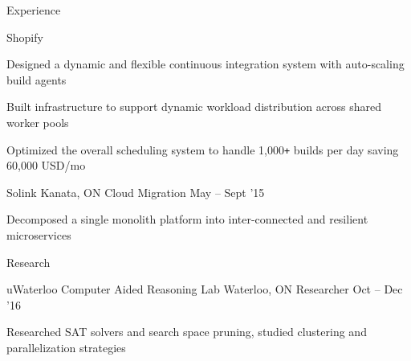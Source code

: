 \documentclass{resume} %
\begin{document}
\begin{rSection}{Experience}
\begin{rSubsection}{Shopify}
  \item Designed a dynamic and flexible continuous integration system with
    auto-scaling build agents
  \item Built infrastructure to support dynamic workload distribution across
    shared worker pools
  \item Optimized the overall scheduling system to handle 1,000\texttt{+} builds per
    day saving 60,000 USD/mo
  \end{rSubsection}

  \begin{rSubsection}{Solink}
                     {Kanata, ON}
                     {Cloud Migration}
                     {May -- Sept '15}

   \item Decomposed a single monolith platform into inter-connected and
      resilient microservices
  \end{rSubsection}
\end{rSection}


\begin{rSection}{Research}
  \begin{rSubsection}{uWaterloo Computer Aided Reasoning Lab}
                     {Waterloo, ON}
                     {Researcher}
                     {Oct -- Dec '16}
   \item Researched SAT solvers and search space pruning, studied clustering and
     parallelization strategies
  \end{rSubsection}
\end{rSection}

\end{document}
